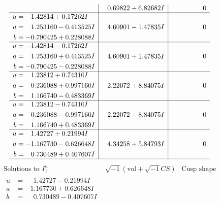 \documentclass[1p]{elsarticle_modified}
\theoremstyle{definition}
\newcommand{\I}{\sqrt{-1}}
\begin{document}
$$\begin{array}{c|c|c}
 & \phantom{-}0.69822 + 6.82682 I & \phantom{-0.000000 } 0 \\ \hline\begin{aligned}
u &= -1.42814 + 0.17262 I \\
a &= \phantom{-}1.253160 - 0.413525 I \\
b &= -0.790425 + 0.228088 I\end{aligned}
 & \phantom{-}4.60901 - 1.47835 I & \phantom{-0.000000 } 0 \\ \hline\begin{aligned}
u &= -1.42814 - 0.17262 I \\
a &= \phantom{-}1.253160 + 0.413525 I \\
b &= -0.790425 - 0.228088 I\end{aligned}
 & \phantom{-}4.60901 + 1.47835 I & \phantom{-0.000000 } 0 \\ \hline\begin{aligned}
u &= \phantom{-}1.23812 + 0.74310 I \\
a &= \phantom{-}0.236088 + 0.997160 I \\
b &= \phantom{-}1.166740 - 0.483369 I\end{aligned}
 & \phantom{-}2.22072 + 8.84075 I & \phantom{-0.000000 } 0 \\ \hline\begin{aligned}
u &= \phantom{-}1.23812 - 0.74310 I \\
a &= \phantom{-}0.236088 - 0.997160 I \\
b &= \phantom{-}1.166740 + 0.483369 I\end{aligned}
 & \phantom{-}2.22072 - 8.84075 I & \phantom{-0.000000 } 0 \\ \hline\begin{aligned}
u &= \phantom{-}1.42727 + 0.21994 I \\
a &= -1.167730 - 0.626648 I \\
b &= \phantom{-}0.730489 + 0.407607 I\end{aligned}
 & \phantom{-}4.34258 + 5.84793 I & \phantom{-0.000000 } 0\\
 \hline 
 \end{array}$$\newpage$$\begin{array}{c|c|c}  
\text{Solutions to }I^u_{1}& \I (\text{vol} + \sqrt{-1}CS) & \text{Cusp shape}\\
 \hline 
\begin{aligned}
u &= \phantom{-}1.42727 - 0.21994 I \\
a &= -1.167730 + 0.626648 I \\
b &= \phantom{-}0.730489 - 0.407607 I\end{aligned}

\end{array}$$
\end{document}
